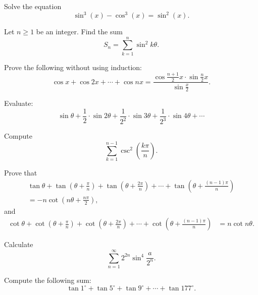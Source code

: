 \documentclass[12pt,a4paper]{memoir}
\theoremstyle{definition}
\begin{document}
\begin{question} Solve the equation \[ \sin^3 \left( x \right) - \cos^3 \left( x \right) = \sin^2 \left( x \right).\]
\end{question}


\begin{question} Let $n\geq 1$ be an integer. Find the sum $$S_n=\sum_{k=1}^n\sin^2 k\theta.$$
\end{question}



\begin{question} Prove the following without using induction:
	\[\cos x + \cos 2x + \cdots + \cos nx = \frac{\displaystyle \cos \frac{n+1}{2}x \cdot \sin \frac{n}{2}x}{\displaystyle \sin \frac{x}{2}}.\]
\end{question}


\begin{question} Evaluate:
	\[ \sin \theta + \frac{1}{2}\cdot \sin 2 \theta + \frac{1}{2^2} \cdot \sin 3 \theta + \frac{1}{2^3} \cdot \sin 4\theta+\cdots \]
\end{question}


\begin{question} Compute \[\displaystyle \sum_{k=1}^{n-1}\csc^2 \left( \frac{k\pi}{n} \right) .\]
\end{question}


\begin{question} Prove that
	\begin{multline*}
		\tan\theta+\tan\left(\theta+\frac{\pi}{n}\right)+\tan\left(\theta+\frac{2\pi}{n}\right)+\cdots +\tan\left(\theta+\frac{(n-1)\pi}{n}\right) \\ =-n\cot\left(n\theta+\frac{n\pi}{2}\right),
	\end{multline*}
	and
	\begin{align*}
		\cot\theta+\cot\left(\theta+\frac{\pi}{n}\right)+\cot\left(\theta+\frac{2\pi}{n}\right)+\cdots +\cot\left(\theta+\frac{(n-1)\pi}{n}\right) &=n\cot n\theta.
	\end{align*}
\end{question}


\begin{question} Calculate
	\[\sum_{n=1}^\infty 2^{2n}\sin^4 \frac{a}{2^n}.\]
\end{question}


\begin{question} Compute the following sum:
	\[\tan 1^\circ + \tan 5^\circ +\tan 9^\circ + \cdots +\tan 177^\circ.\]
\end{question}
\end{document}
